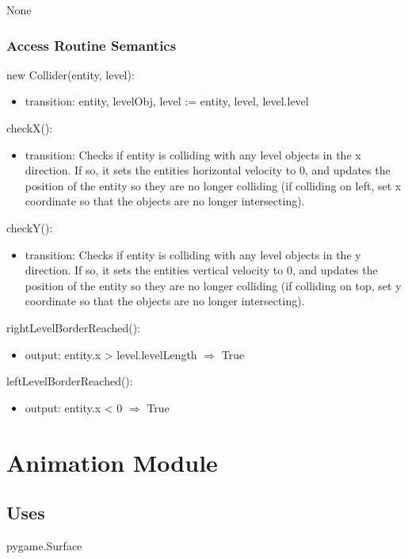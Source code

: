 \documentclass[12pt]{article}
\begin{document}
None

\subsubsection* {Access Routine Semantics}

new Collider(entity, level):
\begin{itemize}
    \item transition: entity, levelObj, level := entity, level, level.level
\end{itemize}

checkX():
\begin{itemize}
    \item transition: Checks if entity is colliding with any level objects in the x direction. If so, it sets the entities horizontal velocity to 0, and updates the position of the entity so they are no longer colliding (if colliding on left, set x coordinate so that the objects are no longer intersecting).
\end{itemize}

checkY():
\begin{itemize}
    \item transition: Checks if entity is colliding with any level objects in the y direction. If so, it sets the entities vertical velocity to 0, and updates the position of the entity so they are no longer colliding (if colliding on top, set y coordinate so that the objects are no longer intersecting).
\end{itemize}

rightLevelBorderReached():
\begin{itemize}
    \item output: entity.x > level.levelLength $\Rightarrow$ True
\end{itemize}

leftLevelBorderReached():
\begin{itemize}
    \item output: entity.x < 0 $\Rightarrow$ True
\end{itemize}

\newpage

\section* {Animation Module}

\subsection* {Uses}
pygame.Surface
\end{document}
